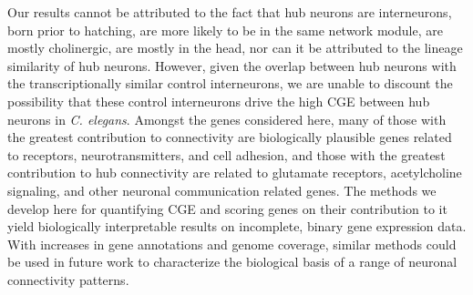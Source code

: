 \documentclass[10pt,letterpaper]{article}
\begin{document}
{Our results cannot be attributed to the fact that hub neurons are interneurons, born prior to hatching, are more likely to be in the same network module, are mostly cholinergic, are mostly in the head, nor can it be attributed to the lineage similarity of hub neurons.
However, given the overlap between hub neurons with the transcriptionally similar control interneurons, we are unable to discount the possibility that these control interneurons drive the high CGE between hub neurons in \emph{C. elegans}.
Amongst the genes considered here, many of those with the greatest contribution to connectivity are biologically plausible genes related to receptors, neurotransmitters, and cell adhesion, and those with the greatest contribution to hub connectivity are related to glutamate receptors, acetylcholine signaling, and other neuronal communication related genes.
The methods we develop here for quantifying CGE and scoring genes on their contribution to it yield biologically interpretable results on incomplete, binary gene expression data.
With increases in gene annotations and genome coverage, similar methods could be used in future work to characterize the biological basis of a range of neuronal connectivity patterns.


}
\end{document}
